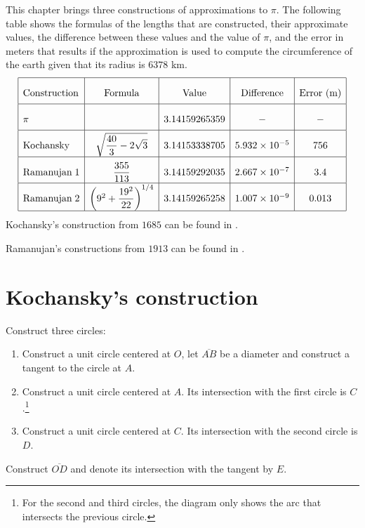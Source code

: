 This chapter brings three constructions of approximations to $\pi$. The following table shows the formulas of the lengths that are constructed, their approximate values, the difference between these values and the value of $\pi$, and the error in meters that results if the approximation is used to compute the circumference of the earth given that its radius is $6378$ km.
\[
\renewcommand{\arraystretch}{2.2}
\begin{array}{|l|c|c|c|c|}
\hline
\textrm{Construction} & \textrm{Formula} &\textrm{Value} & \textrm{Difference} & \textrm{Error (m)}\\\hline
\pi & & 3.14159265359 & - & -\\\hline
\textrm{Kochansky} & \sqrt{\disfrac{40}{3}-2\sqrt{3}}&
  3.14153338705 & 5.932 \times 10^{-5} & 756\\\hline
\textrm{Ramanujan}\; 1 & \disfrac{355}{113} &
  3.14159292035 &2.667  \times 10^{-7}&3.4\\\hline
\textrm{Ramanujan}\; 2 &\left(9^2+\disfrac{19^2}{22}\right)^{1/4}&
  3.14159265258 & 1.007 \times 10^{-9}& 0.013\\\hline
\end{array}
\]
Kochansky's construction from $1685$ can be found in \cite{bold}.

Ramanujan's constructions from $1913$ can be found in \cite{ramanujan1,ramanujan2}.

\newpage



\section{Kochansky's construction}

Construct three circles:
\begin{enumerate}
\item Construct a unit circle centered at $O$, let $\overline{AB}$ be a diameter and construct a tangent to the circle at $A$.
\item Construct a unit circle centered at $A$. Its intersection with the first circle is $C$.\footnote{For the second and third circles, the diagram only shows the arc that intersects the previous circle.}
\item Construct a unit circle centered at $C$. Its intersection with the second circle is $D$. 
\end{enumerate}
Construct $\overline{OD}$ and denote its intersection with the tangent by $E$.

